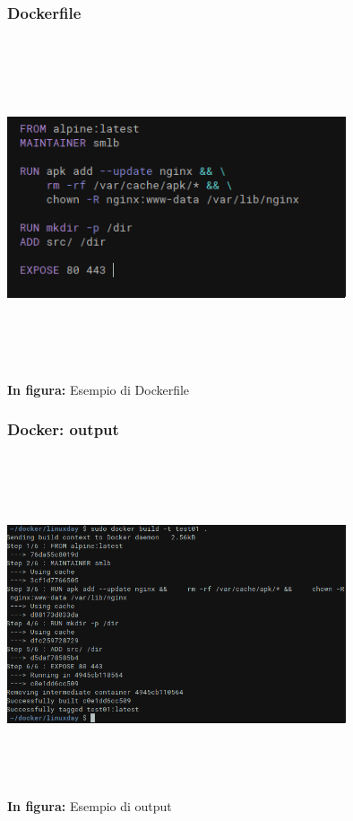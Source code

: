 \documentclass{beamer}
\begin{document}
\begin{frame}
    \frametitle{Dockerfile}
    \begin{center}
        \includegraphics[width=10cm,height=10cm,keepaspectratio]{dockerfile.png}
        \\ \textbf{In figura:} Esempio di Dockerfile
    \end{center}
\end{frame}


\begin{frame}
    \frametitle{Docker: output}
    \begin{center}
        \includegraphics[width=10cm,height=10cm,keepaspectratio]{docker_output.png}
        \\ \textbf{In figura:} Esempio di output 
    \end{center}
\end{frame}
\end{document}
